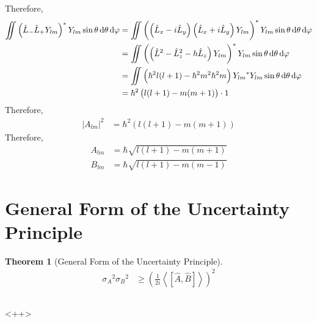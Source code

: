 \documentclass[titlepage, fleqn, a4paper, 12pt, twoside]{article}
\theoremstyle{definition}
\theoremstyle{theorem}
\newtheorem{theorem}{Theorem}
\let\Oldsection\section
\renewcommand{\section}{\FloatBarrier\Oldsection}
\let\Oldsubsection\subsection
\renewcommand{\subsection}{\FloatBarrier\Oldsubsection}
\begin{document}
Therefore,
\begin{align*}
	\iint \left( \hat{L}_- \hat{L}_+ Y_{l m} \right)^* Y_{l m} \sin \theta \dif \theta \dif \varphi &= \iint \left( \left( \hat{L}_x - i \hat{L}_y \right) \left( \hat{L}_x + i \hat{L}_y \right) Y_{l m} \right)^* Y_{l m} \sin \theta \dif \theta \dif \varphi\\
	&= \iint \left( \left( \hat{L}^2 - {\hat{L}_z}^2 - h \hat{L}_z \right) Y_{l m} \right)^* Y_{l m} \sin \theta \dif \theta \dif \varphi\\
	&= \iint \left( \hbar^2 l (l + 1) - \hbar^2 m^2 \hbar^2 m \right) {Y_{l m}}^* Y_{l m} \sin \theta \dif \theta \dif \varphi\\
	&= \hbar^2 \left( l (l + 1) - m (m + 1) \right) \cdot 1
\end{align*}
Therefore,
\begin{align*}
	|A_{l m}|^2 &= \hbar^2 \left( l (l + 1) - m (m + 1) \right)
\end{align*}
Therefore,
\begin{align*}
	A_{l m} &= \hbar \sqrt{l (l + 1) - m (m + 1)}\\
	B_{l m} &= \hbar \sqrt{l (l + 1) - m (m - 1)}
\end{align*}

\section{General Form of the Uncertainty Principle}

\begin{theorem}[General Form of the Uncertainty Principle]
	\begin{align*}
		{\sigma_A}^2 {\sigma_B}^2 &\ge \left( \frac{1}{2 i} \left\langle \left[ \hat{A},\hat{B} \right] \right\rangle \right)^2
	\end{align*}
	\label{thm:General_Form_of_the_Uncertainty_Principle}
\end{theorem}

\subsection{}<++>
\end{document}
